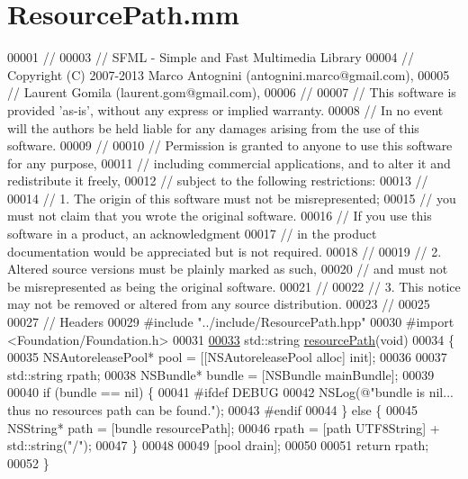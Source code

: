 \hypertarget{_resource_path_8mm_source}{}\section{Resource\+Path.\+mm}
\label{_resource_path_8mm_source}

\begin{DoxyCode}
00001 \textcolor{comment}{//}
00003 \textcolor{comment}{// SFML - Simple and Fast Multimedia Library}
00004 \textcolor{comment}{// Copyright (C) 2007-2013 Marco Antognini (antognini.marco@gmail.com),}
00005 \textcolor{comment}{//                         Laurent Gomila (laurent.gom@gmail.com),}
00006 \textcolor{comment}{//}
00007 \textcolor{comment}{// This software is provided 'as-is', without any express or implied warranty.}
00008 \textcolor{comment}{// In no event will the authors be held liable for any damages arising from the use of this software.}
00009 \textcolor{comment}{//}
00010 \textcolor{comment}{// Permission is granted to anyone to use this software for any purpose,}
00011 \textcolor{comment}{// including commercial applications, and to alter it and redistribute it freely,}
00012 \textcolor{comment}{// subject to the following restrictions:}
00013 \textcolor{comment}{//}
00014 \textcolor{comment}{// 1. The origin of this software must not be misrepresented;}
00015 \textcolor{comment}{//    you must not claim that you wrote the original software.}
00016 \textcolor{comment}{//    If you use this software in a product, an acknowledgment}
00017 \textcolor{comment}{//    in the product documentation would be appreciated but is not required.}
00018 \textcolor{comment}{//}
00019 \textcolor{comment}{// 2. Altered source versions must be plainly marked as such,}
00020 \textcolor{comment}{//    and must not be misrepresented as being the original software.}
00021 \textcolor{comment}{//}
00022 \textcolor{comment}{// 3. This notice may not be removed or altered from any source distribution.}
00023 \textcolor{comment}{//}
00025 \textcolor{comment}{}
00027 \textcolor{comment}{// Headers}
00029 \textcolor{comment}{}\textcolor{preprocessor}{#include "../include/ResourcePath.hpp"}
00030 \textcolor{preprocessor}{#import <Foundation/Foundation.h>}
00031 
\hypertarget{_resource_path_8mm_source_l00033}{}\hyperlink{_resource_path_8mm_a377b456e3964835648f2d726c2e4f510}{00033} std::string \hyperlink{_resource_path_8mm_a377b456e3964835648f2d726c2e4f510}{resourcePath}(\textcolor{keywordtype}{void})
00034 \{
00035     NSAutoreleasePool* pool = [[NSAutoreleasePool alloc] init];
00036 
00037     std::string rpath;
00038     NSBundle* bundle = [NSBundle mainBundle];
00039 
00040     \textcolor{keywordflow}{if} (bundle == nil) \{
00041 \textcolor{preprocessor}{#ifdef DEBUG}
00042         NSLog(\textcolor{stringliteral}{@"bundle is nil... thus no resources path can be found."});
00043 \textcolor{preprocessor}{#endif}
00044     \} \textcolor{keywordflow}{else} \{
00045         NSString* path = [bundle resourcePath];
00046         rpath = [path UTF8String] + std::string(\textcolor{stringliteral}{"/"});
00047     \}
00048 
00049     [pool drain];
00050 
00051     \textcolor{keywordflow}{return} rpath;
00052 \}
\end{DoxyCode}
